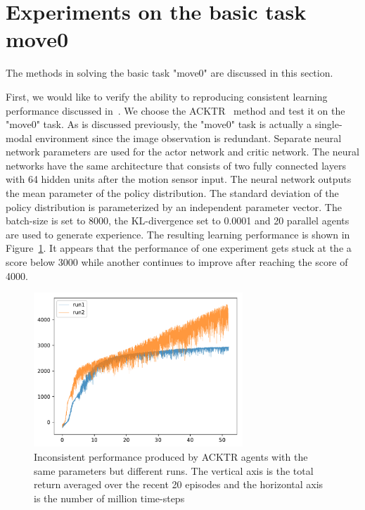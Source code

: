 
\section{Experiments on the basic task move0}\label{sec_exp_move0}

The methods in solving the basic task "move0" are discussed in this section.

First, we would like to verify the ability to reproducing consistent learning performance discussed in~\cite{henderson2017matters}. We choose the ACKTR~\cite{wu2017scalable} method and test it on the "move0" task. As is discussed previously, the "move0" task is actually a single-modal environment since the image observation is redundant. Separate neural network parameters are used for the actor network and critic network. The neural networks have the same architecture that consists of two fully connected layers with 64 hidden units after the motion sensor input. The neural network outputs the mean parameter of the policy distribution. The standard deviation of the policy distribution is parameterized by an independent parameter vector. The batch-size is set to 8000, the KL-divergence set to 0.0001 and 20 parallel agents are used to generate experience. The resulting learning performance is shown in Figure~\ref{fig_acktr_reprod}. It appears that the performance of one experiment gets stuck at the a score below 3000 while another continues to improve after reaching the score of 4000. 
\begin{figure}[!htbp]
	\includegraphics[width=0.7\textwidth]{images/rec_acktr_reprod}
	\centering
	\caption{Inconsistent performance produced by ACKTR agents with the same  parameters but different runs. The vertical axis is the total return averaged over the recent 20 episodes and the horizontal axis is the number of million time-steps}\label{fig_acktr_reprod}
\end{figure}

